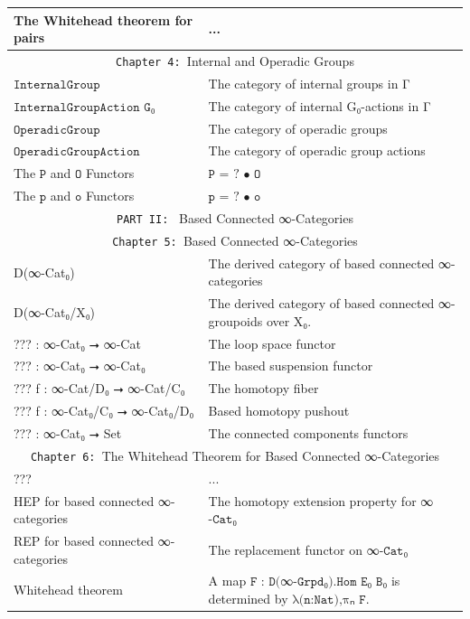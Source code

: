 \documentclass{book}
\theoremstyle{definition}
\begin{document}
{\begin{longtable}{|| l || l ||}
\hline
The Whitehead theorem for pairs & ... \\
\hline \hline
 \multicolumn{2}{||c||}{\texttt{Chapter 4: }Internal and Operadic Groups} \\
\hline \hline
 $\texttt{InternalGroup}$   & The category of internal groups in Γ  \\
 \hline
 $\texttt{InternalGroupAction G₀}$ & The category of internal G₀-actions in Γ   \\
 \hline
  $\texttt{OperadicGroup}$  & The category of operadic groups  \\
 \hline
 $\texttt{OperadicGroupAction}$  & The category of operadic group actions  \\
 \hline
  The $\texttt{P}$ and $\texttt{O}$ Functors & $\texttt{P = ? • O}$ \\
 \hline
 The $\texttt{p}$ and $\texttt{o}$ Functors & $\texttt{p = ? • o}$ \\
\hline \hline
\multicolumn{2}{||c||}{\texttt{PART II: } Based Connected ∞-Categories} \\
\hline \hline
\multicolumn{2}{||c||}{\texttt{Chapter 5: }Based Connected ∞-Categories} \\
\hline \hline
D(∞-Cat₀) & The derived category of based connected ∞-categories \\
\hline
D(∞-Cat₀/X₀) & The derived category of based connected ∞-groupoids over X₀. \\
\hline
??? : ∞-Cat₀ ⭢ ∞-Cat & The loop space functor \\
\hline
??? : ∞-Cat₀ ⭢ ∞-Cat₀ & The based suspension functor \\
\hline 
??? f : ∞-Cat/D₀ ⭢ ∞-Cat/C₀ & The homotopy fiber\\
\hline 
??? f : ∞-Cat₀/C₀ ⭢ ∞-Cat₀/D₀ & Based homotopy pushout \\
 \hline 
??? : ∞-Cat₀ ⭢ Set & The connected components functors\\
 \hline \hline
  \multicolumn{2}{||c||}{\texttt{Chapter 6: }The Whitehead Theorem for Based Connected ∞-Categories} \\
\hline \hline
??? & ...\\
\hline
HEP for based connected ∞-categories & The homotopy extension property for ∞$\texttt{-Cat}$₀\\
\hline
REP for based connected ∞-categories & The replacement functor on ∞$\texttt{-Cat}$₀ \\
 \hline 
Whitehead theorem & A map $\texttt{F : D(}$∞$\texttt{-Grpd₀).Hom E₀ B₀}$ is determined by $\texttt{λ(n:Nat),πₙ F}$. \\

\end{longtable}}
\end{document}
